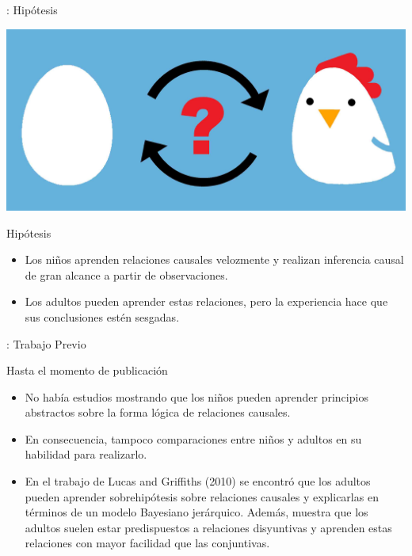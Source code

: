 

\begin{frame}[fragile]{\shortt: Hipótesis}

\begin{center}
\includegraphics[scale=0.05]{images/gallina.jpg}
\end{center}
\begin{block}{Hipótesis}
\begin{itemize}
\item Los niños aprenden \alert{relaciones causales} velozmente y realizan inferencia causal de gran alcance a partir de observaciones. 

\item Los adultos pueden aprender estas relaciones, pero la experiencia hace que sus conclusiones estén sesgadas. 

\end{itemize}
\end{block}
\end{frame}

\begin{frame}[fragile]{\shortt: Trabajo Previo}


\begin{block}{Hasta el momento de publicación}

\begin{itemize}
\item No había estudios mostrando que los niños pueden aprender principios abstractos sobre la forma lógica de relaciones causales.
\item En consecuencia, tampoco comparaciones entre niños y adultos en su habilidad para realizarlo.
\item En el trabajo de \alert{Lucas and Griffiths (2010)} se encontró que los adultos pueden aprender \alert{sobrehipótesis} sobre relaciones causales y explicarlas en términos de un modelo Bayesiano jerárquico. Además, muestra que los adultos suelen estar predispuestos a relaciones disyuntivas y aprenden estas relaciones con mayor facilidad que las conjuntivas.
\end{itemize}    



\end{block}

\end{frame}

